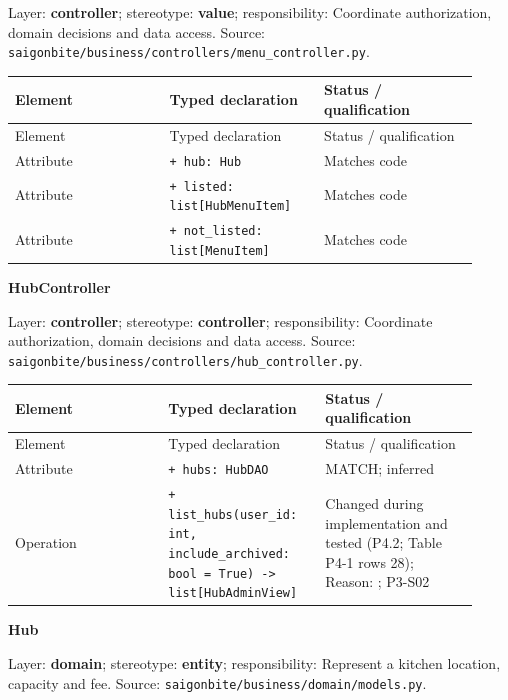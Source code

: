Layer: \textbf{controller}; stereotype: \textbf{\guillemotleft{}value\guillemotright{}}; responsibility: Coordinate authorization, domain decisions and data access. Source: \texttt{saigonbite/\allowbreak{}business/\allowbreak{}controllers/\allowbreak{}menu\_\allowbreak{}controller.\allowbreak{}py}.

\begin{longtable}{>{\raggedright\arraybackslash}p{0.3067\linewidth}>{\raggedright\arraybackslash}p{0.3067\linewidth}>{\raggedright\arraybackslash}p{0.3067\linewidth}}
Element & Typed declaration & Status / qualification \\
\hline\endfirsthead
Element & Typed declaration & Status / qualification \\
\hline\endhead
Attribute & \texttt{+ hub: Hub} & Matches code \\
Attribute & \texttt{+ listed: list[HubMenuItem]} & Matches code \\
Attribute & \texttt{+ not\_\allowbreak{}listed: list[MenuItem]} & Matches code \\
\end{longtable}
\textbf{HubController}

Layer: \textbf{controller}; stereotype: \textbf{\guillemotleft{}controller\guillemotright{}}; responsibility: Coordinate authorization, domain decisions and data access. Source: \texttt{saigonbite/\allowbreak{}business/\allowbreak{}controllers/\allowbreak{}hub\_\allowbreak{}controller.\allowbreak{}py}.

\begin{longtable}{>{\raggedright\arraybackslash}p{0.3067\linewidth}>{\raggedright\arraybackslash}p{0.3067\linewidth}>{\raggedright\arraybackslash}p{0.3067\linewidth}}
Element & Typed declaration & Status / qualification \\
\hline\endfirsthead
Element & Typed declaration & Status / qualification \\
\hline\endhead
Attribute & \texttt{+ hubs: HubDAO} & MATCH; inferred \\
Operation & \texttt{+ list\_\allowbreak{}hubs(user\_\allowbreak{}id: int, include\_\allowbreak{}archived: bool = True) -\textgreater{} list[HubAdminView] } & Changed during implementation and tested (P4.2; Table P4-1 rows 28); Reason: ; P3-S02 \\
\end{longtable}
\textbf{Hub}

Layer: \textbf{domain}; stereotype: \textbf{\guillemotleft{}entity\guillemotright{}}; responsibility: Represent a kitchen location, capacity and fee. Source: \texttt{saigonbite/\allowbreak{}business/\allowbreak{}domain/\allowbreak{}models.\allowbreak{}py}.

